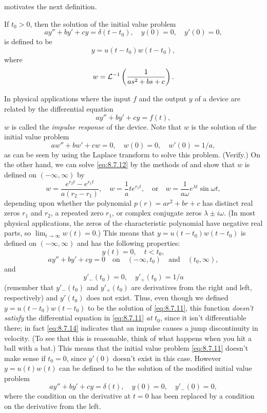  motivates the next definition.

\begin{definition}\label{thmtype:8.7.2}
If $t_0>0$, then the solution of the initial value problem
\begin{equation} \label{eq:8.7.11}
ay''+by'+cy=\delta(t-t_0), \quad  y(0)=0,\quad y'(0)=0,
\end{equation}
is defined to be
\[
y=u(t-t_0)w(t-t_0),
\]
where
\[
w={\mathcal L}^{-1}\left(\frac{1}{as^2+bs+c}\right).
\]
\end{definition}

In physical applications where the input $f$ and the output $y$ of a
device are related by the differential equation
\[
ay''+by'+cy=f(t),
\]
$w$ is called the \emph{\color{blue}impulse response}
of the device. Note
that
$w$ is the solution of the initial value problem
\begin{equation} \label{eq:8.7.12}
aw''+bw'+cw=0, \quad  w(0)=0,\quad  w'(0)=1/a,
\end{equation}
as can be seen by using the Laplace transform to solve this problem.
(Verify.)
On the other hand, we can solve \eqref{eq:8.7.12} by the methods of
 and show that $w$ is defined on
$(-\infty,\infty)$ by
\begin{equation} \label{eq:8.7.13}
w=\frac{e^{r_2t}-e^{r_1t}}{a(r_2-r_1)},\quad
w=\frac{1}{a}te^{r_1t}, \quad\text{or}\quad
w=\frac{1}{a\omega}e^{\lambda t}\sin\omega t,
\end{equation}
depending upon whether the polynomial $p(r)=ar^2+br+c$ has distinct
real zeros $r_1$ and $r_2$, a repeated zero $r_1$, or complex
conjugate zeros $\lambda\pm i\omega$. (In most physical applications,
the zeros of the characteristic polynomial have negative real parts,
so $\lim_{t\to\infty}w(t)=0$.) This means that $y=u(t-t_0)w(t-t_0)$ is
defined on $(-\infty,\infty)$ and has the following properties:
\[
y(t)=0,\quad  t<t_0,
\]
\[
ay''+by'+cy=0\quad\text{on}\quad(-\infty,t_0)\quad\text{and}\quad(t_0,\infty),
\]
and
\begin{equation} \label{eq:8.7.14}
y'_-(t_0)=0, \quad   y'_+(t_0)=1/a
\end{equation}
(remember that $y'_-(t_0)$ and $y'_+(t_0)$ are derivatives from the
right and left, respectively) and $y'(t_0)$ does not exist. Thus, even
though we defined $y=u(t-t_0)w(t-t_0)$ to be the solution of
\eqref{eq:8.7.11},  this function \emph{\color{blue}doesn't satisfy}
the differential equation in \eqref{eq:8.7.11} \emph{\color{blue}at} $t_0$, since it
isn't differentiable there;   in fact \eqref{eq:8.7.14} indicates that an
impulse causes a jump discontinuity in velocity. (To see that this is
reasonable, think of what happens when you hit a ball with a bat.)
This means that the initial value problem \eqref{eq:8.7.11} doesn't make
sense if $t_0=0$, since $y'(0)$ doesn't exist in this case. However
$y=u(t)w(t)$ can be defined to be the solution of the modified initial
value problem
\[
ay''+by'+cy=\delta(t), \quad  y(0)=0,\quad y'_-(0)=0,
\]
where the condition on the derivative at $t=0$ has been replaced by a
condition on the derivative from the left.


